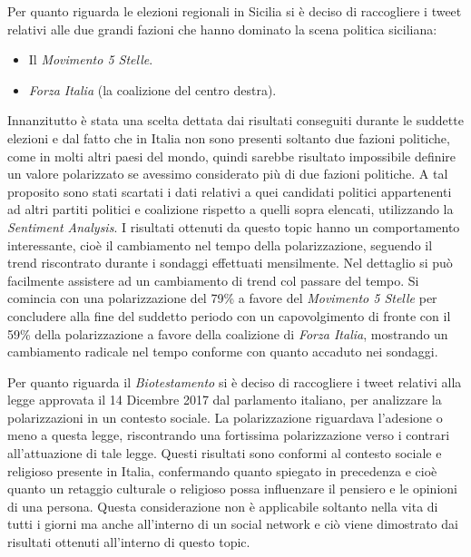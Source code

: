 Per quanto riguarda le elezioni regionali in Sicilia si è deciso di raccogliere i tweet relativi alle due grandi fazioni che hanno dominato la scena politica siciliana:
\begin{itemize}
\item  Il \textit{Movimento 5 Stelle}. 
\item \textit{Forza Italia} (la coalizione del centro destra).
\end{itemize}
Innanzitutto è stata una scelta dettata dai risultati conseguiti durante le suddette elezioni e dal fatto che in Italia non sono presenti soltanto due fazioni politiche, come in molti altri paesi del mondo, quindi sarebbe risultato impossibile definire un valore polarizzato se avessimo considerato più di due fazioni politiche.
A tal proposito sono stati scartati i dati relativi a quei candidati politici appartenenti ad altri partiti politici e coalizione rispetto a quelli sopra elencati, utilizzando la \textit{Sentiment Analysis}.
I risultati ottenuti da questo topic hanno un comportamento interessante, cioè il cambiamento nel tempo della polarizzazione, seguendo il trend riscontrato durante i sondaggi effettuati mensilmente. Nel dettaglio si può facilmente assistere ad un cambiamento di trend col passare del tempo.
Si comincia con una polarizzazione del 79\% a favore del \textit{Movimento 5 Stelle} per concludere alla fine del suddetto periodo con un capovolgimento di fronte con il 59\% della polarizzazione a favore della coalizione di \textit{Forza Italia}, mostrando un cambiamento radicale nel tempo conforme con quanto accaduto nei sondaggi.

Per quanto riguarda il \textit{Biotestamento} si è deciso di raccogliere i tweet relativi alla legge approvata il 14 Dicembre 2017 dal parlamento italiano, per analizzare la polarizzazioni in un contesto sociale.
La polarizzazione riguardava l'adesione o meno a questa legge, riscontrando una fortissima polarizzazione verso i contrari all'attuazione di tale legge. %
Questi risultati sono conformi al contesto sociale e religioso presente in Italia, confermando quanto spiegato in precedenza e cioè quanto un retaggio culturale o religioso possa influenzare il pensiero e le opinioni di una persona. Questa considerazione non è applicabile soltanto nella vita di tutti i giorni ma anche all'interno di un social network e ciò viene dimostrato dai risultati ottenuti all'interno di questo topic.

